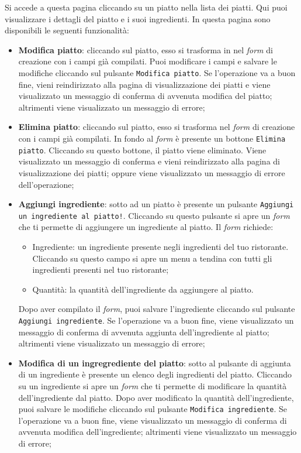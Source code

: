 Si accede a questa pagina cliccando su un piatto nella lista dei piatti. Qui
puoi visualizzare i dettagli del piatto e i suoi ingredienti. In questa pagina
sono disponibili le seguenti funzionalità:
\begin{itemize}
	\item \textbf{Modifica piatto}: cliccando sul piatto, esso si trasforma in
		nel \textit{form} di creazione con i campi già compilati. Puoi modificare i
		campi e salvare le modifiche cliccando sul pulsante \texttt{Modifica
		piatto}. Se l'operazione va a buon fine, vieni reindirizzato alla
		pagina di visualizzazione dei piatti e viene visualizzato un messaggio
		di conferma di avvenuta modifica del piatto; altrimenti viene
		visualizzato un messaggio di errore;

	\item \textbf{Elimina piatto}: cliccando sul piatto, esso si trasforma nel
		\textit{form} di creazione con i campi già compilati. In fondo al \textit{form} è presente
		un bottone \texttt{Elimina piatto}. Cliccando su questo bottone, il
		piatto viene eliminato. Viene visualizzato un messaggio di conferma e
		vieni reindirizzato alla pagina di visualizzazione dei piatti; oppure 
		viene visualizzato un messaggio di errore dell'operazione;

	\item \textbf{Aggiungi ingrediente}: sotto ad un piatto è presente un
		pulsante \texttt{Aggiungi un ingrediente al piatto!}. Cliccando su
		questo pulsante si apre un \textit{form} che ti permette di aggiungere un
		ingrediente al piatto. Il \textit{form} richiede:
		\begin{itemize}
			\item Ingrediente: un ingrediente presente negli ingredienti del tuo
				ristorante. Cliccando su questo campo si apre un menu a
				tendina con tutti gli ingredienti presenti nel tuo ristorante;

			\item Quantità: la quantità dell'ingrediente da aggiungere al piatto.
		\end{itemize}

		Dopo aver compilato il \textit{form}, puoi salvare l'ingrediente cliccando sul
		pulsante \texttt{Aggiungi ingrediente}. Se l'operazione va a buon fine,
		viene visualizzato un messaggio di conferma di avvenuta aggiunta
		dell'ingrediente al piatto; altrimenti viene visualizzato un messaggio
		di errore;

	\item \textbf{Modifica di un ingregrediente del piatto}: sotto al pulsante
		di aggiunta di un ingrediente è presente un elenco degli ingredienti
		del piatto. Cliccando su un ingrediente si apre un \textit{form} che ti permette
		di modificare la quantità dell'ingrediente dal piatto. Dopo aver 
		modificato la quantità
		dell'ingrediente, puoi salvare le modifiche cliccando sul pulsante
		\texttt{Modifica ingrediente}. Se l'operazione va a buon fine, viene visualizzato un
		messaggio di conferma di avvenuta modifica dell'ingrediente; altrimenti
		viene visualizzato un messaggio di errore;


\end{itemize}
